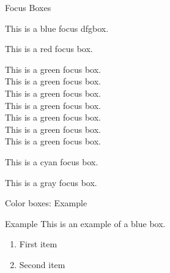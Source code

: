 \redheader
\begin{frame}{Focus Boxes}
    \begin{bluefocus}
    This is a blue focus dfgbox.
    \end{bluefocus}
    
    \begin{redfocus}
    This is a red focus box.
    \end{redfocus}
    
    \begin{greenfocus}
    This is a green focus box.\\
    This is a green focus box.\\
    This is a green focus box.\\
    This is a green focus box.\\
    This is a green focus box.\\
    This is a green focus box.\\
    This is a green focus box.
    \end{greenfocus}
    
    \begin{cyanfocus}
    This is a cyan focus box.
    \end{cyanfocus}
    
    \begin{grayfocus}
    This is a gray focus box.
    \end{grayfocus}
\end{frame}

\begin{frame}{Color boxes: Example}
\begin{bluebox}{Example}
This is an example of a blue box.
\begin{enumerate}
    \item First item
    \item Second item
\end{enumerate}
\end{bluebox}
\end{frame}